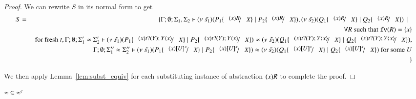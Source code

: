 \begin{proof}
	We can rewrite $S$ in its normal form to get
	\begin{eqnarray*}
		S &=& \set{ \Gamma; \es; \Sigma_1, \Sigma_2 \proves \newsp{\tilde{s_1}}{P_1 \subst{(x) R}{X} \Par P_2 \subst{(x) R}{X}}, \newsp{\tilde{s_2}}{Q_1 \subst{(x) R}{X} \Par Q_2 \subst{(x) R}{X}} \setbar \\
		&& \forall R \textrm{ such that } \fv{R} = \set{x}\\
		&& \textrm{ for fresh } t,  \Gamma; \es; \Sigma_1' \wb \Sigma_2' \proves \newsp{\tilde{s_1}}{P_1 \subst{(x) \binp{t}{Y} \appl{Y}{x}}{X} \Par P_2 \subst{(x) \binp{t}{Y} \appl{Y}{x}}{X}} \wb \newsp{\tilde{s_2}}{Q_1 \subst{(x) \binp{t}{Y} \appl{Y}{x}}{X} \Par Q_2 \subst{(x) \binp{t}{Y} \appl{Y}{x}}{X}}, \\
		&& \Gamma; \es; \Sigma_1'' \wb \Sigma_2'' \proves \newsp{\tilde{s_1}}{P_1 \subst{(x) \map{U}^x}{X} \Par P_2 \subst{(x) \map{U}^x}{X}} \wb \newsp{\tilde{s_2}}{Q_1 \subst{(x) \map{U}^x}{X} \Par Q_2 \subst{(x) \map{U}^x}{X}} \textrm{ for some } U \\
		&&}
	\end{eqnarray*}

	We then apply Lemma~\ref{lem:subst_equiv} for each substituting instance of abstraction
	$(x)R$ to complete the proof.
\end{proof}


\begin{lemma}\rm
	\label{lem:wb_is_wbc}
	$\approx\ \subseteq\ \approx^{c}$
\end{lemma}

